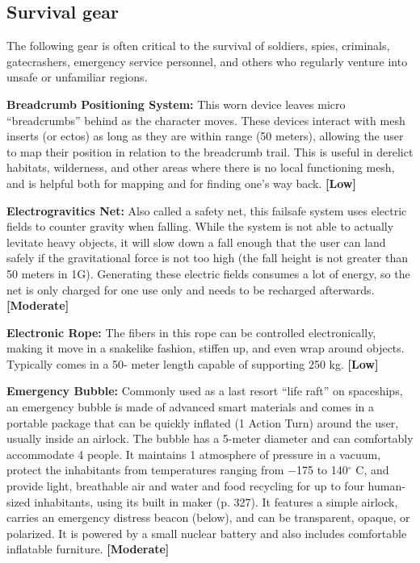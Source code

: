 \subsection{Survival gear} \label{sec:survival-gear} 

The following gear is often critical to the survival of soldiers, spies, criminals, gatecrashers, emergency service personnel, and others who regularly venture into unsafe or unfamiliar regions. 

\textbf{Breadcrumb Positioning System:} This worn device leaves micro ``breadcrumbs'' behind as the character moves. These devices interact with mesh inserts (or ectos) as long as they are within range (50 meters), allowing the user to map their position in relation to the breadcrumb trail. This is useful in derelict habitats, wilderness, and other areas where there is no local functioning mesh, and is helpful both for mapping and for finding one’s way back. \textbf{[Low]} 

\textbf{Electrogravitics Net:} Also called a safety net, this failsafe system uses electric fields to counter gravity when falling. While the system is not able to actually levitate heavy objects, it will slow down a fall enough that the user can land safely if the gravitational force is not too high (the fall height is not greater than 50 meters in 1G). Generating these electric fields consumes a lot of energy, so the net is only charged for one use only and needs to be recharged afterwards. \textbf{[Moderate]} 

\textbf{Electronic Rope:} The fibers in this rope can be controlled electronically, making it move in a snakelike fashion, stiffen up, and even wrap around objects. Typically comes in a 50- meter length capable of supporting 250 kg. \textbf{[Low]} 

\textbf{Emergency Bubble:} Commonly used as a last resort ``life raft'' on spaceships, an emergency bubble is made of advanced smart materials and comes in a portable package that can be quickly inflated (1 Action Turn) around the user, usually inside an airlock. The bubble has a 5-meter diameter and can comfortably accommodate 4 people. It maintains 1 atmosphere of pressure in a vacuum, protect the inhabitants from temperatures ranging from $-$175 to 140$^{\circ}$ C, and provide light, breathable air and water and food recycling for up to four human-sized inhabitants, using its built in maker (p. 327). It features a simple airlock, carries an emergency distress beacon (below), and can be transparent, opaque, or polarized. It is powered by a small nuclear battery and also includes comfortable inflatable furniture. \textbf{[Moderate]} 


